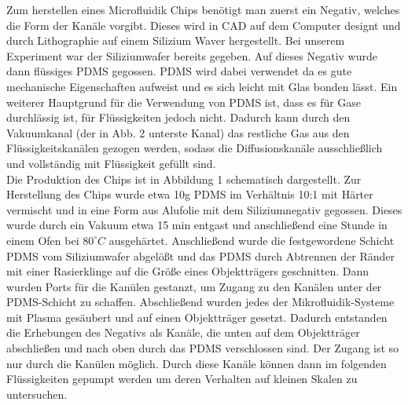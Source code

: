 \documentclass[11pt, a4paper]{article}
\begin{document}
Zum herstellen eines Microfluidik Chips benötigt man zuerst ein Negativ, welches die Form der Kanäle vorgibt. Dieses wird in CAD auf dem Computer designt und durch Lithographie auf einem Silizium Waver hergestellt. Bei unserem Experiment war der Siliziumwafer bereits gegeben. 
Auf dieses Negativ wurde dann flüssiges PDMS gegossen. PDMS wird dabei verwendet da es gute mechanische Eigenschaften aufweist und es sich leicht mit Glas bonden lässt. Ein weiterer Hauptgrund für die Verwendung von PDMS ist, dass es für Gase durchlässig ist, für Flüssigkeiten jedoch nicht. Dadurch kann durch den Vakuumkanal (der in Abb. 2 unterste Kanal) das restliche Gas aus den Flüssigkeitskanälen gezogen werden, sodass die Diffusionskanäle ausschließlich und vollständig mit Flüssigkeit gefüllt sind. \\

Die Produktion des Chips ist in Abbildung 1 schematisch dargestellt. Zur Herstellung des Chips wurde etwa 10g PDMS im Verhältnis 10:1 mit Härter vermischt und in eine Form aus Alufolie mit dem Siliziumnegativ gegossen. Dieses wurde durch ein Vakuum etwa 15 min entgast und anschließend eine Stunde in einem Ofen bei $80^{\circ}C$ ausgehärtet. Anschließend wurde die festgewordene Schicht PDMS vom Siliziumwafer abgelößt und das PDMS durch Abtrennen der Ränder mit einer Rasierklinge auf die Größe eines Objektträgers geschnitten. Dann wurden Ports für die Kanülen gestanzt, um Zugang zu den Kanälen unter der PDMS-Schicht zu schaffen. Abschließend wurden jedes der Mikrofluidik-Systeme mit Plasma gesäubert und auf einen Objektträger gesetzt. Dadurch entstanden die Erhebungen des Negativs als Kanäle, die unten auf dem Objektträger abschließen und nach oben durch das PDMS verschlossen sind. Der Zugang ist so nur durch die Kanülen möglich. Durch diese Kanäle können dann im folgenden Flüssigkeiten gepumpt werden um deren Verhalten auf kleinen Skalen zu untersuchen.
\end{document}
